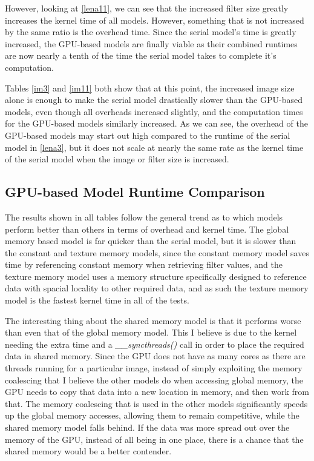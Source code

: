 \documentclass[a4paper,twoside,11pt]{report}
\begin{document}
However, looking at \cref{lena11}, we can see that the increased filter size greatly increases the kernel time of all models. However, something that is not increased by the same ratio is the overhead time. Since the serial model's time is greatly increased, the GPU-based models are finally viable as their combined runtimes are now nearly a tenth of the time the serial model takes to complete it's computation.

Tables \ref{im3} and \ref{im11} both show that at this point, the increased image size alone is enough to make the serial model drastically slower than the GPU-based models, even though all overheads increased slightly, and the computation times for the GPU-based models similarly increased. As we can see, the overhead of the GPU-based models may start out high compared to the runtime of the serial model in \cref{lena3}, but it does not scale at nearly the same rate as the kernel time of the serial model when the image or filter size is increased.

\subsection{GPU-based Model Runtime Comparison}
The results shown in all tables follow the general trend as to which models perform better than others in terms of overhead and kernel time. The global memory based model is far quicker than the serial model, but it is slower than the constant and texture memory models, since the constant memory model saves time by referencing constant memory when retrieving filter values, and the texture memory model uses a memory structure specifically designed to reference data with spacial locality to other required data, and as such the texture memory model is the fastest kernel time in all of the tests.

The interesting thing about the shared memory model is that it performs worse than even that of the global memory model. This I believe is due to the kernel needing the extra time and a \textit{\_\_syncthreads()} call in order to place the required data in shared memory. Since the GPU does not have as many cores as there are threads running for a particular image, instead of simply exploiting the memory coalescing that I believe the other models do when accessing global memory, the GPU needs to copy that data into a new location in memory, and then work from that. The memory coalescing that is used in the other models significantly speeds up the global memory accesses, allowing them to remain competitive, while the shared memory model falls behind. If the data was more spread out over the memory of the GPU, instead of all being in one place, there is a chance that the shared memory would be a better contender.
\end{document}
